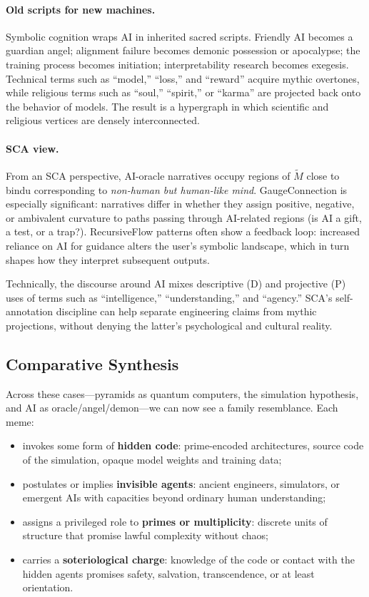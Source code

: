 \documentclass[12]{amsart}
\theoremstyle{plain}
\begin{document}
\paragraph{Old scripts for new machines.} Symbolic cognition wraps AI in inherited sacred scripts. Friendly AI becomes a guardian angel; alignment failure becomes demonic possession or apocalypse; the training process becomes initiation; interpretability research becomes exegesis. Technical terms such as ``model,'' ``loss,'' and ``reward'' acquire mythic overtones, while religious terms such as ``soul,'' ``spirit,'' or ``karma'' are projected back onto the behavior of models. The result is a hypergraph in which scientific and religious vertices are densely interconnected.

\paragraph{SCA view.} From an SCA perspective, AI-oracle narratives occupy regions of $\tilde M$ close to bindu corresponding to \emph{non-human but human-like mind}. GaugeConnection is especially significant: narratives differ in whether they assign positive, negative, or ambivalent curvature to paths passing through AI-related regions (is AI a gift, a test, or a trap?). RecursiveFlow patterns often show a feedback loop: increased reliance on AI for guidance alters the user's symbolic landscape, which in turn shapes how they interpret subsequent outputs.

Technically, the discourse around AI mixes descriptive (\textsc{D}) and projective (\textsc{P}) uses of terms such as ``intelligence,'' ``understanding,'' and ``agency.'' SCA's self-annotation discipline can help separate engineering claims from mythic projections, without denying the latter's psychological and cultural reality.

\subsection{Comparative Synthesis}

Across these cases---pyramids as quantum computers, the simulation hypothesis, and AI as oracle/angel/demon---we can now see a family resemblance. Each meme:

\begin{itemize}
  \item invokes some form of \textbf{hidden code}: prime-encoded architectures, source code of the simulation, opaque model weights and training data;
  \item postulates or implies \textbf{invisible agents}: ancient engineers, simulators, or emergent AIs with capacities beyond ordinary human understanding;
  \item assigns a privileged role to \textbf{primes or multiplicity}: discrete units of structure that promise lawful complexity without chaos;
  \item carries a \textbf{soteriological charge}: knowledge of the code or contact with the hidden agents promises safety, salvation, transcendence, or at least orientation.
\end{itemize}
\end{document}
